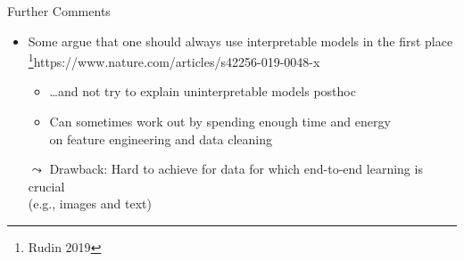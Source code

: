 \documentclass[11pt,compress,t,notes=noshow, xcolor=table]{beamer}
\begin{document}
\begin{vbframe}{Further Comments}

    \begin{itemize}
        \item Some argue that one should always use interpretable models in the first place \footnote{Rudin 2019}{https://www.nature.com/articles/s42256-019-0048-x}
        \begin{itemize}
            \item \ldots and not try to explain uninterpretable models posthoc
            \item Can sometimes work out by spending enough time and energy\\ on feature engineering and data cleaning
        \end{itemize}
        \item[$\leadsto$] Drawback: Hard to achieve for data for which end-to-end learning is crucial\\ (e.g., images and text)
    \end{itemize}	
	
\end{vbframe}
\end{document}

